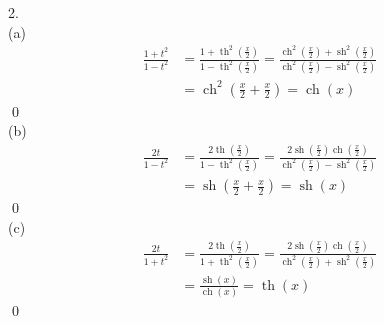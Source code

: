 \documentclass[10pt]{article}
\DeclareMathOperator{\ch}{ch}
\DeclareMathOperator{\sh}{sh}
\DeclareMathOperator{\tah}{th}
\begin{document}
\begin{tcolorbox}[enhanced, width=7in, center, size=fbox, fontupper=\large, drop shadow southwest]
    2.\\
    (a)
    \begin{align*}
        \frac{1+t^2}{1-t^2}&=\frac{1+\tah^2(\frac{x}{2})}{1-\tah^2(\frac{x}{2})}=\frac{\ch^2(\frac{x}{2})+\sh^2(\frac{x}{2})}{\ch^2(\frac{x}{2})-\sh^2(\frac{x}{2})}\\
        &=\ch^2\left(\frac{x}{2}+\frac{x}{2}\right)=\ch(x)
    \end{align*}
    \qed\\
    (b)
    \begin{align*}
        \frac{2t}{1-t^2}&=\frac{2\tah(\frac{x}{2})}{1-\tah^2(\frac{x}{2})}=\frac{2\sh(\frac{x}{2})\ch(\frac{x}{2})}{\ch^2(\frac{x}{2})-\sh^2(\frac{x}{2})}\\
        &=\sh\left(\frac{x}{2}+\frac{x}{2}\right)=\sh(x)
    \end{align*}
    \qed\\
    (c)
    \begin{align*}
        \frac{2t}{1+t^2}&=\frac{2\tah(\frac{x}{2})}{1+\tah^2(\frac{x}{2})}=\frac{2\sh(\frac{x}{2})\ch(\frac{x}{2})}{\ch^2(\frac{x}{2})+\sh^2(\frac{x}{2})}\\
        &=\frac{\sh(x)}{\ch(x)}=\tah(x)
    \end{align*}
    \qed
\end{tcolorbox}
\end{document}
